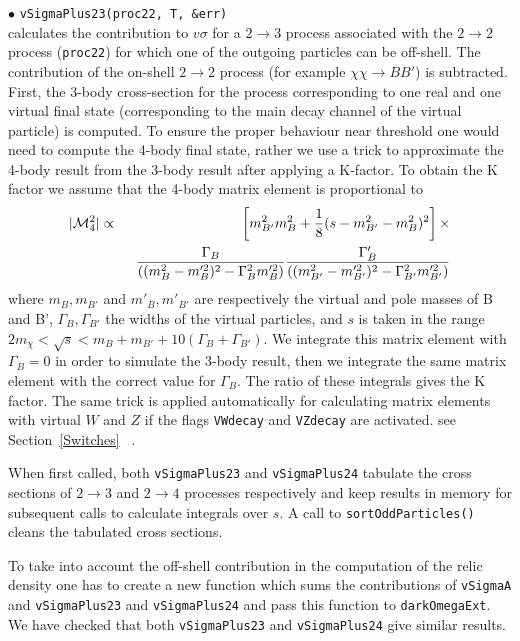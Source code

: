 \documentclass[12pt,a4paper]{article}
\begin{document}
\noindent
$\bullet$ \verb|vSigmaPlus23(proc22, T, &err)|\\
calculates the contribution to  $v\sigma$ for a $2\to 3$ process  associated with the  $2\to2$ process ({\tt proc22})  for which one of the outgoing particles can be off-shell.  The contribution of the on-shell $2\to2$ process (for example $\chi\chi\to B B'$) is subtracted.
First, the 3-body cross-section for the process  corresponding to one real and one virtual final state (corresponding to the main decay channel of the virtual particle) is computed. 
To ensure the proper behaviour near threshold one would need to compute the 4-body final state, rather we use a trick  to approximate the 4-body result from the 3-body result after applying a K-factor.
To obtain the K factor we assume that the 4-body matrix element is proportional to
\begin{eqnarray}
\label{ME_WW}
|{\cal M}_{4}^2|  \propto&&
\left[  m_{B'}^2 m_B^2 +\frac{1}{8}(s -m_{B'}^2 -m_{B}^2)^2\right] \times\\
&& \;\;\frac{\Gamma_B}{\left((m_B^2-m_B'^2)^2-\Gamma^2_B m_B'^2\right)}
\frac{\Gamma_B'}{\left((m_{B'}^2-m_{B'}'^2)^2-\Gamma^2_{B'} m_{B'}'^2\right)}
\end{eqnarray}
where $m_B, m_{B'}$ and $m'_{B}, m'_{B'}$ are respectively the virtual and pole masses of B and B', $\Gamma_B,\Gamma_{B'}$ the widths of the virtual particles,
and  $s$ is taken in the range $ 2 m_\chi < \sqrt{s} < m_B+m_{B'} + 10 (\Gamma_B+\Gamma_{B'}) $. 
 We integrate this matrix element
with $\Gamma_B=0$ in order to simulate the 3-body result, then we integrate the same matrix
element with the correct value for $\Gamma_B$. The ratio of these integrals gives the K factor. 
 The same trick is applied automatically  for calculating matrix elements with virtual $W$ and $Z$ 
 if the flags {\tt VWdecay} and {\tt VZdecay} are activated. see Section~\ref{Switches} ~\cite{Belanger:2013oya}.  

When first called, both {\tt vSigmaPlus23} and {\tt vSigmaPlus24}  tabulate the cross sections of $2\to 3$ and $2\to 4$ processes respectively  
and keep results in memory for subsequent calls  to calculate integrals over $s$. A call to {\tt sortOddParticles()} cleans the  tabulated cross sections.


To take into account the off-shell contribution in the computation of the relic density one has to create a new function   which sums the contributions of {\tt vSigmaA} and 
{\tt vSigmaPlus23} and {\tt vSigmaPlus24} and pass this function to {\tt darkOmegaExt}. We have checked that both {\tt vSigmaPlus23} and {\tt vSigmaPlus24} give similar results.
\end{document}
